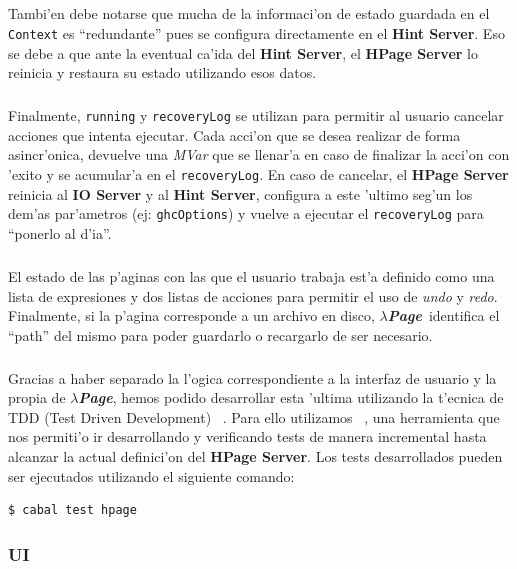 \documentclass[a4paper]{article}
\newcommand{\hpage}{\textbf{\textsl{$\lambda$Page}}}
\begin{document}
\subparagraph{}Tambi'en debe notarse que mucha de la informaci'on de estado guardada en el \texttt{Context} es ``redundante'' pues se configura directamente en el \textbf{Hint Server}.  Eso se debe a que ante la eventual ca'ida del \textbf{Hint Server}, el \textbf{HPage Server} lo reinicia y restaura su estado utilizando esos datos.
\subparagraph{}Finalmente, \texttt{running} y \texttt{recoveryLog} se utilizan para permitir al usuario cancelar acciones que intenta ejecutar.  Cada acci'on que se desea realizar de forma asincr'onica, devuelve una \textsl{MVar} que se llenar'a en caso de finalizar la acci'on con 'exito y se acumular'a en el \texttt{recoveryLog}.  En caso de cancelar, el \textbf{HPage Server} reinicia al \textbf{IO Server} y al \textbf{Hint Server}, configura a este 'ultimo seg'un los dem'as par'ametros (ej: \texttt{ghcOptions}) y vuelve a ejecutar el \texttt{recoveryLog} para ``ponerlo al d'ia''.
\subparagraph{}El estado de las p'aginas con las que el usuario trabaja est'a definido como una lista de expresiones y dos listas de acciones para permitir el uso de \textsl{undo} y \textsl{redo}.  Finalmente, si la p'agina corresponde a un archivo en disco, \hpage\ identifica el ``path'' del mismo para poder guardarlo o recargarlo de ser necesario.
\subparagraph{}Gracias a haber separado la l'ogica correspondiente a la interfaz de usuario y la propia de \hpage, hemos podido desarrollar esta 'ultima utilizando la t'ecnica de TDD (Test Driven Development) ~\cite{tdd}.  Para ello utilizamos ~\cite{quickcheck}, una herramienta que nos permiti'o ir desarrollando y verificando tests de manera incremental hasta alcanzar la actual definici'on del \textbf{HPage Server}.  Los tests desarrollados pueden ser ejecutados utilizando el siguiente comando:
\lstset{language=sh, frame=single, tabsize=2}
\begin{center}\begin{lstlisting}
$ cabal test hpage
\end{lstlisting}\end{center}
\lstset{language=haskell, frame=single, tabsize=4}

\subsubsection{UI}
\end{document}
